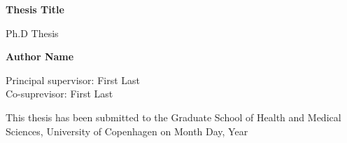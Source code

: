 
    \begin{center}
        \vspace*{1cm}

        \Huge
        \textbf{Thesis Title}

        \vspace{0.5cm}
        \LARGE
        Ph.D Thesis


        \vspace{1.5cm}

        \textbf{Author Name}

        \vspace{1.5cm}
        Principal supervisor: First Last
        \\
        Co-suprevisor: First Last
        \vfill


        This thesis has been submitted to the Graduate School of Health and Medical Sciences, University of Copenhagen on Month Day, Year

    \end{center}
